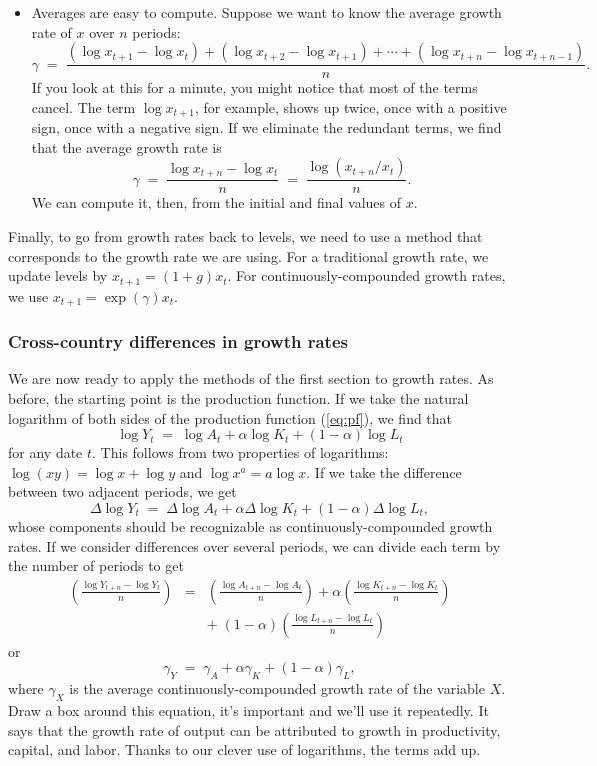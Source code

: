 \documentclass[letterpaper,12pt]{article}
\begin{document}
\begin{itemize}
\item Averages are easy to compute.  Suppose we want to know the average growth rate of
$x$ over $n$ periods:
\[
    \gamma \;=\; \frac{ (\log x_{t+1}-\log x_t) + (\log x_{t+2}-\log x_{t+1})
                    + \cdots + (\log x_{t+n} - \log x_{t+n-1}) }
                {n} .
\]
If you look at this for a minute, you might notice that most of the terms cancel.
The term $\log x_{t+1}$, for example, shows up twice, once with a positive sign, once with a negative sign.
If we eliminate the redundant terms, we find that the average growth rate is
\[
    \gamma \;=\; \frac{ \log x_{t+n}-\log x_t }  {n}  \;=\; \frac{ \log (x_{t+n}/x_t) }  {n} .
\]
We can compute it, then, from the initial and final values of $x$.

\end{itemize}
Finally, to go from growth rates back to levels,
we need to use a method that corresponds to the growth rate we are using.
For a traditional growth rate, we update levels by
$ x_{t+1} = (1+g) x_t$.
For continuously-compounded growth rates, we use
$ x_{t+1} = \exp(\gamma) x_t $.


\subsubsection*{Cross-country differences in growth rates}

We are now ready to apply the methods of the first section to growth rates.
As before, the starting point is the production function.
If we take the natural logarithm of both sides of the production function (\ref{eq:pf}),
we find that
\[
    \log Y_t \;=\;  \log A_t + \alpha \log K_t
            + (1-\alpha) \log L_t
\]
for any date $t$.
This follows from two properties of logarithms:  $ \log (xy) = \log x + \log y$
and $\log x^a = a \log x$.
If we take the difference between two adjacent periods, we get
\[
    \Delta \log Y_t \;=\;  \Delta \log A_t + \alpha \Delta \log K_t
            + (1-\alpha) \Delta \log L_t ,
\]
whose components should be recognizable as continuously-compounded growth rates.
If we consider differences over several periods,
we can divide each term by the number of periods to get
\begin{eqnarray*}
    \left( \frac{ \log Y_{t+n} - \log Y_t }{n} \right) &=&
                    \left( \frac{\log A_{t+n} - \log A_t} {n} \right)
                    + \alpha \left( \frac{ \log K_{t+n} - \log K_t} {n} \right) \\
        && + \; (1-\alpha) \left( \frac{\log L_{t+n} - \log L_t} {n} \right)
\end{eqnarray*}
or
\begin{equation}
    \gamma_Y \;=\; \gamma_A + \alpha \gamma_K + (1-\alpha) \gamma_L,
    \label{eq:gammaY}
\end{equation}
where $\gamma_X$ is the  average continuously-compounded growth
rate of the variable $X$.
Draw a box around this equation, it's important and we'll use it repeatedly.  
It says that the growth rate of output can
be attributed to growth in productivity, capital, and labor.
Thanks to our clever use of logarithms, the terms add up.
\end{document}
